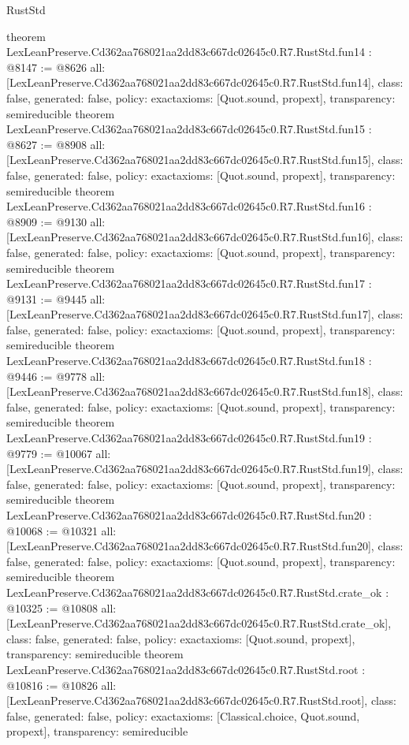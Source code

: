 \begin{lexlean}{RustStd}
\begin{coremodule}
{}
theorem LexLeanPreserve.Cd362aa768021aa2dd83c667dc02645c0.R7.RustStd.fun14 : @8147 := @8626 {
  all: [LexLeanPreserve.Cd362aa768021aa2dd83c667dc02645c0.R7.RustStd.fun14],
  class: false,
  generated: false,
  policy: exact{axioms: [Quot.sound, propext]},
  transparency: semireducible
}
theorem LexLeanPreserve.Cd362aa768021aa2dd83c667dc02645c0.R7.RustStd.fun15 : @8627 := @8908 {
  all: [LexLeanPreserve.Cd362aa768021aa2dd83c667dc02645c0.R7.RustStd.fun15],
  class: false,
  generated: false,
  policy: exact{axioms: [Quot.sound, propext]},
  transparency: semireducible
}
theorem LexLeanPreserve.Cd362aa768021aa2dd83c667dc02645c0.R7.RustStd.fun16 : @8909 := @9130 {
  all: [LexLeanPreserve.Cd362aa768021aa2dd83c667dc02645c0.R7.RustStd.fun16],
  class: false,
  generated: false,
  policy: exact{axioms: [Quot.sound, propext]},
  transparency: semireducible
}
theorem LexLeanPreserve.Cd362aa768021aa2dd83c667dc02645c0.R7.RustStd.fun17 : @9131 := @9445 {
  all: [LexLeanPreserve.Cd362aa768021aa2dd83c667dc02645c0.R7.RustStd.fun17],
  class: false,
  generated: false,
  policy: exact{axioms: [Quot.sound, propext]},
  transparency: semireducible
}
theorem LexLeanPreserve.Cd362aa768021aa2dd83c667dc02645c0.R7.RustStd.fun18 : @9446 := @9778 {
  all: [LexLeanPreserve.Cd362aa768021aa2dd83c667dc02645c0.R7.RustStd.fun18],
  class: false,
  generated: false,
  policy: exact{axioms: [Quot.sound, propext]},
  transparency: semireducible
}
theorem LexLeanPreserve.Cd362aa768021aa2dd83c667dc02645c0.R7.RustStd.fun19 : @9779 := @10067 {
  all: [LexLeanPreserve.Cd362aa768021aa2dd83c667dc02645c0.R7.RustStd.fun19],
  class: false,
  generated: false,
  policy: exact{axioms: [Quot.sound, propext]},
  transparency: semireducible
}
theorem LexLeanPreserve.Cd362aa768021aa2dd83c667dc02645c0.R7.RustStd.fun20 : @10068 := @10321 {
  all: [LexLeanPreserve.Cd362aa768021aa2dd83c667dc02645c0.R7.RustStd.fun20],
  class: false,
  generated: false,
  policy: exact{axioms: [Quot.sound, propext]},
  transparency: semireducible
}
theorem LexLeanPreserve.Cd362aa768021aa2dd83c667dc02645c0.R7.RustStd.crate_ok : @10325 := @10808 {
  all: [LexLeanPreserve.Cd362aa768021aa2dd83c667dc02645c0.R7.RustStd.crate_ok],
  class: false,
  generated: false,
  policy: exact{axioms: [Quot.sound, propext]},
  transparency: semireducible
}
theorem LexLeanPreserve.Cd362aa768021aa2dd83c667dc02645c0.R7.RustStd.root : @10816 := @10826 {
  all: [LexLeanPreserve.Cd362aa768021aa2dd83c667dc02645c0.R7.RustStd.root],
  class: false,
  generated: false,
  policy: exact{axioms: [Classical.choice, Quot.sound, propext]},
  transparency: semireducible
}


\end{coremodule}
\end{lexlean}
